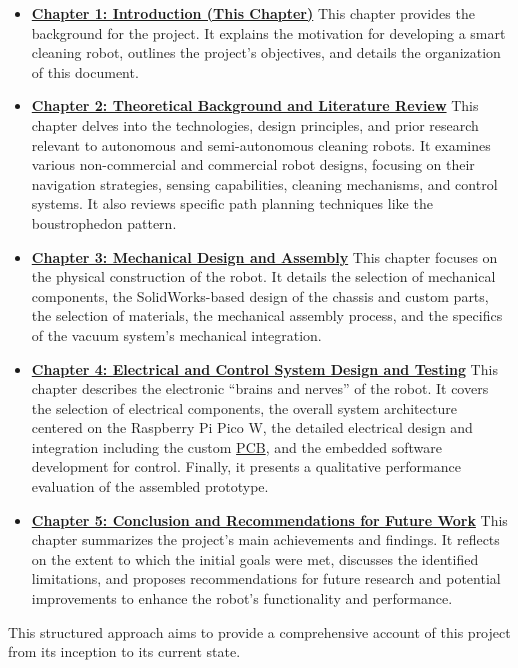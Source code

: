 \begin{itemize}
    \item \textbf{\hyperref[chap:intro]{Chapter 1: Introduction (This Chapter)}} This chapter provides the background for the project. It explains the motivation for developing a smart cleaning robot, outlines the project's objectives, and details the organization of this document.
    \item \textbf{\hyperref[chap:background]{Chapter 2: Theoretical Background and Literature Review}} This chapter delves into the technologies, design principles, and prior research relevant to autonomous and semi-autonomous cleaning robots. It examines various non-commercial and commercial robot designs, focusing on their navigation strategies, sensing capabilities, cleaning mechanisms, and control systems. It also reviews specific path planning techniques like the boustrophedon pattern.
    \item \textbf{\hyperref[chap:mechanical_design_assembly]{Chapter 3: Mechanical Design and Assembly}} This chapter focuses on the physical construction of the robot. It details the selection of mechanical components, the SolidWorks-based design of the chassis and custom parts, the selection of materials, the mechanical assembly process, and the specifics of the vacuum system's mechanical integration.
    \item \textbf{\hyperref[chap:electrical_control_performance]{Chapter 4: Electrical and Control System Design and Testing}} This chapter describes the electronic ``brains and nerves'' of the robot. It covers the selection of electrical components, the overall system architecture centered on the Raspberry Pi Pico W, the detailed electrical design and integration including the custom \hyperref[term:pcb]{PCB}, and the embedded software development for control. Finally, it presents a qualitative performance evaluation of the assembled prototype.
    \item \textbf{\hyperref[chap:conclusion_future_work_new]{Chapter 5: Conclusion and Recommendations for Future Work}} This chapter summarizes the project's main achievements and findings. It reflects on the extent to which the initial goals were met, discusses the identified limitations, and proposes recommendations for future research and potential improvements to enhance the robot's functionality and performance.
\end{itemize}

This structured approach aims to provide a comprehensive account of this project from its inception to its current state.